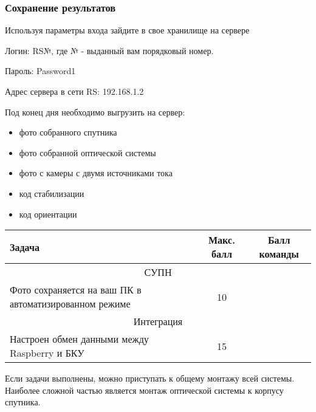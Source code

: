 \subsubsection*{Сохранение результатов}

Используя параметры входа зайдите в свое хранилище на сервере

Логин: RS№, где № - выданный вам порядковый номер.

Пароль: Password1

Адрес сервера в сети RS: 192.168.1.2

Под конец дня необходимо выгрузить на сервер:
\begin{itemize}
    \item фото собранного спутника
    \item фото собранной оптической системы
    \item фото с камеры с двумя источниками тока
    \item код стабилизации
    \item код ориентации
\end{itemize}

\markSection

\begin{table}[H]
    \center
    \begin{tabular}{|p{7cm}|c|c}
        \hline
        Задача&	Макс. балл&	Балл команды \\
        \hline
        \multicolumn{3}{|c|}{СУПН} \\
        \hline
        Фото сохраняется на ваш ПК в автоматизированном режиме	&10	& \\
        \hline
        \multicolumn{3}{|c|}{Интеграция} \\
        \hline
        Настроен обмен данными между Raspberry и БКУ	&15	& \\
        \hline
    \end{tabular}
\end{table}

Если задачи выполнены, можно приступать к общему монтажу всей системы. Наиболее сложной частью является монтаж оптической системы к корпусу спутника.